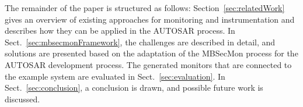 

The remainder of the paper is structured as follows: 
Section~\ref{sec:relatedWork} gives an overview of existing approaches for monitoring and instrumentation and describes how they can be applied in the AUTOSAR process.
In Sect.~\ref{sec:mbsecmonFramework}, the challenges are described in detail, and solutions are presented based on the adaptation of the MBSecMon process for the AUTOSAR development process.
The generated monitors that are connected to the example system are evaluated in Sect.~\ref{sec:evaluation}.
In Sect.~\ref{sec:conclusion}, a conclusion is drawn, and possible future work is discussed.

